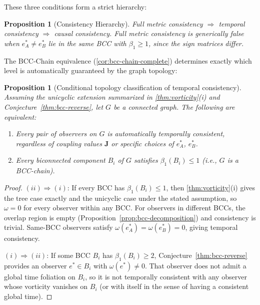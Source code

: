 \documentclass[11pt]{article}
\newtheorem{proposition}[theorem]{Proposition}
\theoremstyle{definition}
\theoremstyle{remark}
\newcommand{\vort}{\omega}
\newcommand{\coupl}{\mathbf{J}}
\newcommand{\betti}{\beta_1}
\begin{document}
These three conditions form a strict hierarchy:

\begin{proposition}[Consistency Hierarchy]
\label{prop:consistency-hierarchy}
Full metric consistency $\Rightarrow$ temporal consistency
$\Rightarrow$ causal consistency.
Full metric consistency is generically false when $e^*_A \neq e^*_B$
lie in the same BCC with $\betti \geq 1$, since the sign matrices differ.
\end{proposition}

The BCC-Chain equivalence (\cref{cor:bcc-chain-complete}) determines exactly
which level is automatically guaranteed by the graph topology:

\begin{proposition}[Conditional topology classification of temporal consistency]
\label{thm:topology-consistency}
Assuming the unicyclic extension summarized in
\cref{thm:vorticity}(i) and Conjecture~\ref{thm:bcc-reverse},
let $G$ be a connected graph. The following are equivalent:
\begin{enumerate}
\item[(i)] Every pair of observers on $G$ is automatically temporally
  consistent, regardless of coupling values $\coupl$ or specific choices
  of $e^*_A$, $e^*_B$.
\item[(ii)] Every biconnected component $B_i$ of $G$ satisfies
  $\betti(B_i) \leq 1$ (i.e., $G$ is a BCC-chain).
\end{enumerate}
\end{proposition}

\begin{proof}
$(ii) \Rightarrow (i)$: If every BCC has $\betti(B_i) \leq 1$, then
\cref{thm:vorticity}(i) gives the tree case exactly and the unicyclic
case under the stated assumption, so $\vort = 0$ for every observer
within any BCC.  For observers in different BCCs, the overlap region is
empty (Proposition~\ref{prop:bcc-decomposition}) and consistency is trivial.
Same-BCC observers satisfy $\vort(e^*_A) = \vort(e^*_B) = 0$, giving temporal
consistency.

$(i) \Rightarrow (ii)$: If some BCC $B_i$ has $\betti(B_i) \geq 2$,
Conjecture~\ref{thm:bcc-reverse} provides an observer $e^* \in B_i$ with
$\vort(e^*) \neq 0$.  That observer does not admit a global time foliation
on $B_i$, so it is not temporally consistent with any observer whose
vorticity vanishes on $B_i$ (or with itself in the sense of having a
consistent global time).
\end{proof}
\end{document}
